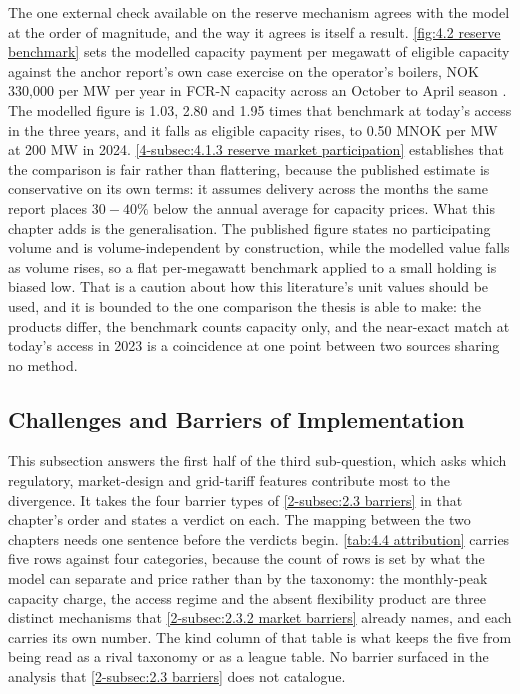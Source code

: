 The one external check available on the reserve mechanism agrees with the model at the order of magnitude, and the way it agrees is itself a result. \autoref{fig:4.2 reserve benchmark} sets the modelled capacity payment per megawatt of eligible capacity against the anchor report's own case exercise on the operator's boilers, NOK 330{,}000 per MW per year in FCR-N capacity across an October to April season \cite{Thema_fjernvarme_2024}. The modelled figure is 1.03, 2.80 and 1.95 times that benchmark at today's access in the three years, and it falls as eligible capacity rises, to 0.50 MNOK per MW at 200 MW in 2024. \autoref{4-subsec:4.1.3 reserve market participation} establishes that the comparison is fair rather than flattering, because the published estimate is conservative on its own terms: it assumes delivery across the months the same report places $30 - 40\%$ below the annual average for capacity prices. What this chapter adds is the generalisation. The published figure states no participating volume and is volume-independent by construction, while the modelled value falls as volume rises, so a flat per-megawatt benchmark applied to a small holding is biased low. That is a caution about how this literature's unit values should be used, and it is bounded to the one comparison the thesis is able to make: the products differ, the benchmark counts capacity only, and the near-exact match at today's access in 2023 is a coincidence at one point between two sources sharing no method.

\subsection{Challenges and Barriers of Implementation}
\label{5-subsec:5.2 implementation barriers}

This subsection answers the first half of the third sub-question, which asks which regulatory, market-design and grid-tariff features contribute most to the divergence. It takes the four barrier types of \autoref{2-subsec:2.3 barriers} in that chapter's order and states a verdict on each. The mapping between the two chapters needs one sentence before the verdicts begin. \autoref{tab:4.4 attribution} carries five rows against four categories, because the count of rows is set by what the model can separate and price rather than by the taxonomy: the monthly-peak capacity charge, the access regime and the absent flexibility product are three distinct mechanisms that \autoref{2-subsec:2.3.2 market barriers} already names, and each carries its own number. The kind column of that table is what keeps the five from being read as a rival taxonomy or as a league table. No barrier surfaced in the analysis that \autoref{2-subsec:2.3 barriers} does not catalogue.

